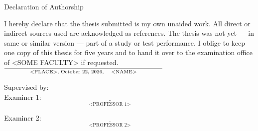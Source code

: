 \begin{center}
	\huge Declaration of Authorship
\end{center}

\vspace{1cm}
{\Large I hereby declare that the thesis submitted is my own unaided work. All direct or indirect sources used are acknowledged as references. The thesis was not yet --- in same or similar version --- part of a study or test performance. I oblige to keep one copy of this thesis for five years and to hand it over to the examination office of <SOME FACULTY> if requested.} \\

\vspace{1cm}
\hspace{6.5cm}
$\underset{\text{<PLACE>, \today, \quad <NAME>}}{\underline{\hspace{8cm}}}$

\vspace{\fill}

Supervised by: \\

Examiner 1: \hspace{2cm}
$\underset{\text{<PROFESSOR 1>}}{\underline{\hspace{8cm}}}$ \vspace{1cm}

Examiner 2: \hspace{2cm}
$\underset{\text{<PROFESSOR 2>}}{\underline{\hspace{8cm}}}$